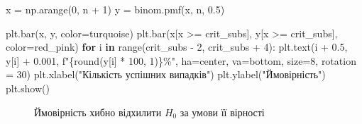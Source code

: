 \documentclass[
  letterpaper,
  10pt,
  openany]{report}
\newenvironment{Shaded}{\begin{snugshade}}{\end{snugshade}}
\newcommand{\BuiltInTok}[1]{\textcolor[rgb]{0.00,0.23,0.31}{#1}}
\newcommand{\ControlFlowTok}[1]{\textcolor[rgb]{0.00,0.23,0.31}{\textbf{#1}}}
\newcommand{\DecValTok}[1]{\textcolor[rgb]{0.68,0.00,0.00}{#1}}
\newcommand{\FloatTok}[1]{\textcolor[rgb]{0.68,0.00,0.00}{#1}}
\newcommand{\KeywordTok}[1]{\textcolor[rgb]{0.00,0.23,0.31}{\textbf{#1}}}
\newcommand{\NormalTok}[1]{\textcolor[rgb]{0.00,0.23,0.31}{#1}}
\newcommand{\OperatorTok}[1]{\textcolor[rgb]{0.37,0.37,0.37}{#1}}
\newcommand{\SpecialCharTok}[1]{\textcolor[rgb]{0.37,0.37,0.37}{#1}}
\newcommand{\SpecialStringTok}[1]{\textcolor[rgb]{0.13,0.47,0.30}{#1}}
\newcommand{\StringTok}[1]{\textcolor[rgb]{0.13,0.47,0.30}{#1}}
\theoremstyle{definition}
\theoremstyle{remark}
\begin{document}
\begin{Shaded}
\begin{Highlighting}[]
\NormalTok{x }\OperatorTok{=}\NormalTok{ np.arange(}\DecValTok{0}\NormalTok{, n }\OperatorTok{+} \DecValTok{1}\NormalTok{)}
\NormalTok{y }\OperatorTok{=}\NormalTok{ binom.pmf(x, n, }\FloatTok{0.5}\NormalTok{)}

\NormalTok{plt.bar(x, y, color}\OperatorTok{=}\NormalTok{turquoise)}
\NormalTok{plt.bar(x[x }\OperatorTok{\textgreater{}=}\NormalTok{ crit\_subs], y[x }\OperatorTok{\textgreater{}=}\NormalTok{ crit\_subs], color}\OperatorTok{=}\NormalTok{red\_pink)}
\ControlFlowTok{for}\NormalTok{ i }\KeywordTok{in} \BuiltInTok{range}\NormalTok{(crit\_subs }\OperatorTok{{-}} \DecValTok{2}\NormalTok{, crit\_subs }\OperatorTok{+} \DecValTok{4}\NormalTok{):}
\NormalTok{    plt.text(i }\OperatorTok{+} \FloatTok{0.5}\NormalTok{, y[i] }\OperatorTok{+} \FloatTok{0.001}\NormalTok{, }\SpecialStringTok{f"}\SpecialCharTok{\{}\BuiltInTok{round}\NormalTok{(y[i] }\OperatorTok{*} \DecValTok{100}\NormalTok{, }\DecValTok{1}\NormalTok{)}\SpecialCharTok{\}}\SpecialStringTok{\%"}\NormalTok{,}
\NormalTok{    ha}\OperatorTok{=}\StringTok{\textquotesingle{}center\textquotesingle{}}\NormalTok{, va}\OperatorTok{=}\StringTok{\textquotesingle{}bottom\textquotesingle{}}\NormalTok{, size}\OperatorTok{=}\DecValTok{8}\NormalTok{, rotation }\OperatorTok{=} \DecValTok{30}\NormalTok{)}
\NormalTok{plt.xlabel(}\StringTok{"Кількість успішних випадків"}\NormalTok{)}
\NormalTok{plt.ylabel(}\StringTok{"Ймовірність"}\NormalTok{)}
\NormalTok{plt.show()}
\end{Highlighting}
\end{Shaded}

\begin{figure}[H]


\caption{\label{fig-binom-pmf-fpr}Ймовірність хибно відхилити \(H_0\) за
умови її вірності}

\end{figure}%
\end{document}
